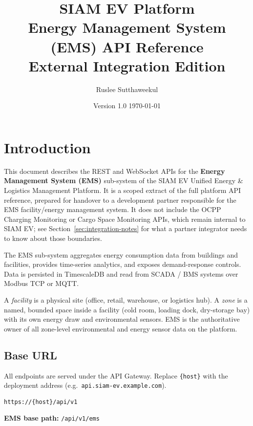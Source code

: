 \documentclass{article}
\title{%
    \textbf{SIAM EV Platform}\\[6pt]
    \large Energy Management System (EMS) API Reference\\
    \normalsize External Integration Edition
}
\author{Ruslee Sutthaweekul}
\date{Version 1.0 \quad\textbullet\quad \today}
\begin{document}
\maketitle
\tableofcontents
\newpage

\section{Introduction}

This document describes the REST and WebSocket APIs for the \textbf{Energy
Management System (EMS)} sub-system of the SIAM EV Unified Energy \& Logistics
Management Platform. It is a scoped extract of the full platform API reference,
prepared for handover to a development partner responsible for the EMS
facility/energy management system. It does not include the OCPP Charging
Monitoring or Cargo Space Monitoring APIs, which remain internal to SIAM EV; see
Section~\ref{sec:integration-notes} for what a partner integrator needs to know
about those boundaries.

The EMS sub-system aggregates energy consumption data from buildings and
facilities, provides time-series analytics, and exposes demand-response
controls. Data is persisted in TimescaleDB and read from SCADA / BMS systems
over Modbus TCP or MQTT.

A \emph{facility} is a physical site (office, retail, warehouse, or logistics
hub). A \emph{zone} is a named, bounded space inside a facility (cold room,
loading dock, dry-storage bay) with its own energy draw and environmental
sensors. EMS is the authoritative owner of all zone-level environmental and
energy sensor data on the platform.

\subsection{Base URL}

All endpoints are served under the API Gateway. Replace \texttt{\{host\}} with the
deployment address (e.g.\ \texttt{api.siam-ev.example.com}).

\begin{lstlisting}[language=bash, caption=Base URL pattern]
https://{host}/api/v1
\end{lstlisting}

\textbf{EMS base path:} \texttt{/api/v1/ems}
\end{document}
